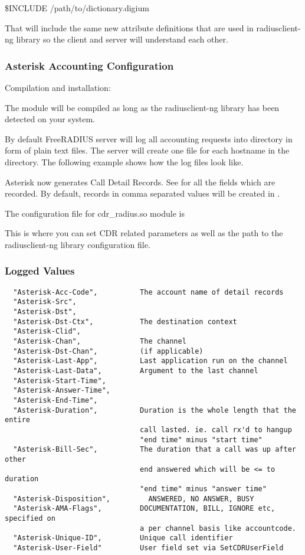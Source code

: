 	\$INCLUDE /path/to/dictionary.digium

	That will include the same new attribute definitions that are used
	in radiusclient-ng library so the client and server will understand each
	other.


\subsubsection{Asterisk Accounting Configuration}

	Compilation and installation:

        The module will be compiled as long as the radiusclient-ng
        library has been detected on your system.
	
	By default FreeRADIUS server will log all accounting requests into
	 directory in form of plain text files.
	The server will create one file for each hostname in the directory. The
	following example shows how the log files look like.

	Asterisk now generates Call Detail Records. See 
	for all the fields which are recorded. By default, records in comma
	separated values will be created in .

	The configuration file for cdr\_radius.so module is 
	
	This is where you can set CDR related parameters as well as the path to
	the radiusclient-ng library configuration file.


\subsubsection{Logged Values}
\begin{verbatim}
  "Asterisk-Acc-Code",          The account name of detail records
  "Asterisk-Src",
  "Asterisk-Dst",
  "Asterisk-Dst-Ctx",           The destination context
  "Asterisk-Clid",
  "Asterisk-Chan",              The channel
  "Asterisk-Dst-Chan",	        (if applicable)
  "Asterisk-Last-App",	        Last application run on the channel
  "Asterisk-Last-Data",         Argument to the last channel
  "Asterisk-Start-Time",
  "Asterisk-Answer-Time",
  "Asterisk-End-Time",
  "Asterisk-Duration",          Duration is the whole length that the entire
                                call lasted. ie. call rx'd to hangup
                                "end time" minus "start time"
  "Asterisk-Bill-Sec", 	        The duration that a call was up after other
                                end answered which will be <= to duration
                                "end time" minus "answer time"
  "Asterisk-Disposition",    	  ANSWERED, NO ANSWER, BUSY
  "Asterisk-AMA-Flags",       	DOCUMENTATION, BILL, IGNORE etc, specified on
                                a per channel basis like accountcode.
  "Asterisk-Unique-ID",         Unique call identifier
  "Asterisk-User-Field"	        User field set via SetCDRUserField
\end{verbatim}
